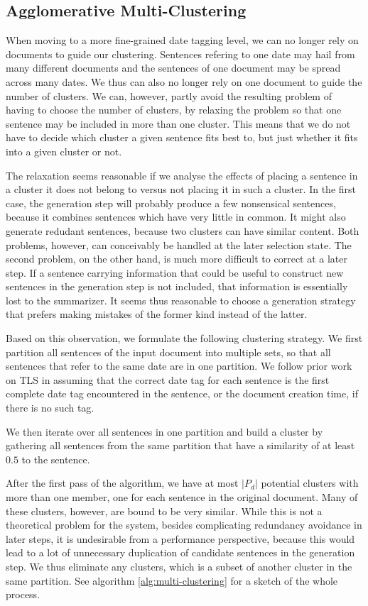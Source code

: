 \documentclass[a4paper,BCOR=10mm]{report}
\begin{document}
\subsection{Agglomerative Multi-Clustering}

When moving to a more fine-grained date tagging level, we can no longer rely on documents to guide our clustering. Sentences refering to one date may hail from many different documents and the sentences of one document may be spread across many dates.
We thus can also no longer rely on one document to guide the number of clusters. We can, however, partly avoid the resulting problem of having to choose the number of clusters, by relaxing the problem so that one sentence may be included in more than one cluster.
This means that we do not have to decide which cluster a given sentence fits best to, but just whether it fits into a given cluster or not.

The relaxation seems reasonable if we analyse the effects of placing a sentence in a cluster it does not belong to versus not placing it in such a cluster.
In the first case, the generation step will probably produce a few nonsensical sentences, because it combines sentences which have very little in common.
It might also generate redudant sentences, because two clusters can have similar content. Both problems, however, can conceivably be handled at the later selection state.
The second problem, on the other hand, is much more difficult to correct at a later step. If a sentence carrying information that could be useful to construct new sentences in the generation step is not included, that information is essentially lost to the summarizer. It seems thus reasonable to choose a generation strategy that prefers making mistakes of the former kind instead of the latter.

Based on this observation, we formulate the following clustering strategy. We first partition all sentences of the input document into multiple sets, so that all sentences that refer to the same date are in one partition. We follow prior work on TLS in assuming that the correct date tag for each sentence is the first complete date tag encountered in the sentence, or the document creation time, if there is no such tag.

We then iterate over all sentences in one partition and build a cluster by gathering all sentences from the same partition that have a similarity of at least $0.5$ to the sentence.

After the first pass of the algorithm, we have at most $|P_d|$ potential clusters with more than one member, one for each sentence in the original document.
Many of these clusters, however, are bound to be very similar. While this is not a theoretical problem for the system, besides complicating redundancy avoidance in later steps, it is undesirable from a performance perspective, because this would lead to a lot of unnecessary duplication of candidate sentences in the generation step.
We thus eliminate any clusters, which is a subset of another cluster in the same partition. See algorithm \ref{alg:multi-clustering} for a sketch of the whole process.
\end{document}
